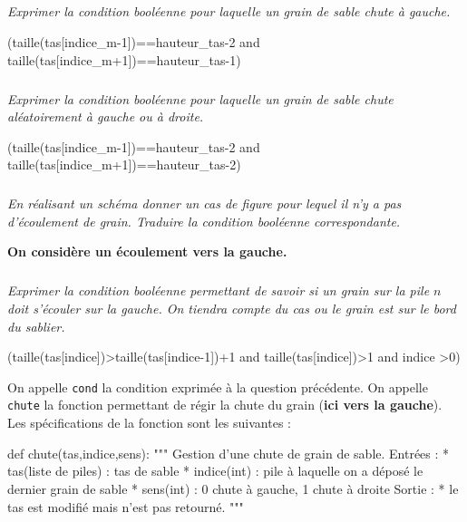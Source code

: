 \documentclass[10pt,fleqn]{article} %
\begin{document}
\subparagraph{}
\textit{Exprimer la condition booléenne pour laquelle un grain de sable chute à gauche.}
\ifprof
\begin{corrige}
\begin{python}
(taille(tas[indice_m-1])==hauteur_tas-2 and taille(tas[indice_m+1])==hauteur_tas-1)
\end{python}
\end{corrige}
\else
\fi

\subparagraph{}
\textit{Exprimer la condition booléenne pour laquelle un grain de sable chute aléatoirement à gauche ou à droite.}
\ifprof
\begin{corrige}
\begin{python}
(taille(tas[indice_m-1])==hauteur_tas-2 and taille(tas[indice_m+1])==hauteur_tas-2)
\end{python}
\end{corrige}
\else
\fi

\subparagraph{}
\textit{En réalisant un schéma donner un cas de figure pour lequel il n'y a pas d'écoulement de grain. Traduire la condition booléenne correspondante.}
\ifprof
\begin{corrige}

\end{corrige}
\else
\fi

\textbf{On considère un écoulement vers la gauche.}

\subparagraph{}
\textit{Exprimer la condition booléenne permettant de savoir si un grain sur la pile $n$ doit s'écouler sur la gauche. On tiendra compte du cas ou le grain est sur le bord du sablier. }
\ifprof
\begin{corrige}
\begin{python}
(taille(tas[indice])>taille(tas[indice-1])+1 and taille(tas[indice])>1 and indice >0)
\end{python}
\end{corrige}
\else
\fi

\vspace{.25cm}

On appelle \texttt{cond} la condition exprimée à la question précédente.
On appelle \texttt{chute} la fonction permettant de régir la chute du grain (\textbf{ici vers la gauche}). Les spécifications de la fonction sont les suivantes : 
\begin{py}
\begin{python}
def chute(tas,indice,sens):
    """
    Gestion d'une chute de grain de sable.
    Entrées : 
     * tas(liste de piles) : tas de sable
     * indice(int) : pile à laquelle on a déposé le dernier grain de sable
     * sens(int) : 0 chute à gauche, 1 chute à droite
    Sortie : 
     * le tas est modifié mais n'est pas retourné.
    """
\end{python}
\end{py}
\end{document}
